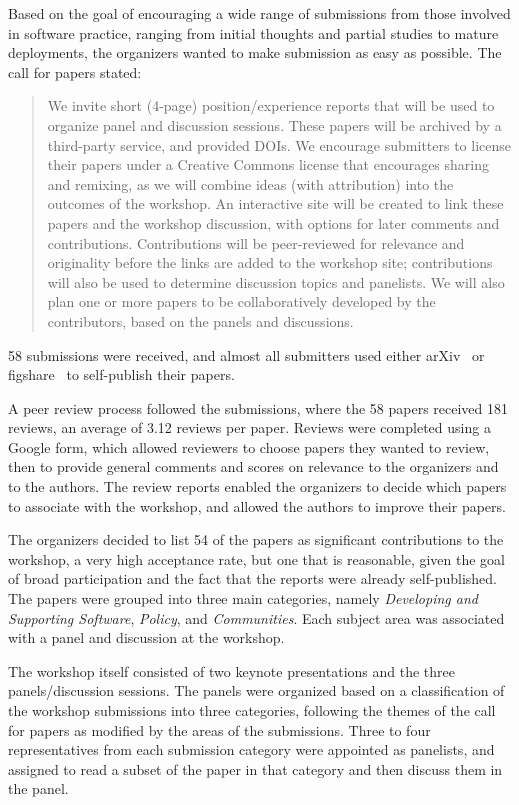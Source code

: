 \documentclass[11pt, oneside]{amsart}
\begin{document}
Based on the goal of encouraging a wide range of submissions from
those involved in software practice, ranging from initial thoughts and
partial studies to mature deployments, the organizers wanted to make
submission as easy as possible. The call for papers stated:

\begin{quote}
We invite short (4-page) position/experience reports that will be used
to organize panel and discussion sessions. These papers will be
archived by a third-party service, and provided DOIs. We encourage
submitters to license their papers under a Creative Commons license
that encourages sharing and remixing, as we will combine ideas (with
attribution) into the outcomes of the workshop.  An interactive site
will be created to link these papers and the workshop discussion, with
options for later comments and contributions. Contributions will be
peer-reviewed for relevance and originality before the links are added
to the workshop site; contributions will also be used to determine
discussion topics and panelists. We will also plan one or more papers
to be collaboratively developed by the contributors, based on the
panels and discussions.
\end{quote}

58 submissions were received, and almost all submitters used either
arXiv~\cite{arXiv-web} or figshare~\cite{figshare-web} to self-publish
their papers.

A peer review process followed the submissions, where
the 58 papers received 181 reviews, an average of 3.12 reviews per
paper. Reviews were completed using a Google form, which allowed
reviewers to choose papers they wanted to review, then to provide
general comments and scores on relevance to the organizers and
to the authors. The review reports enabled the organizers to decide
which papers to associate with the workshop, and allowed the authors
to improve their papers.

The organizers decided to list 54 of the papers as significant
contributions to the workshop, a very high acceptance rate, but one
that is reasonable, given the goal of broad participation and the fact
that the reports were already self-published. The papers were
grouped into three main categories, namely \emph{Developing and
Supporting Software}, \emph{Policy}, and \emph{Communities}. Each
subject area was associated with a panel and discussion at the
workshop.

The workshop itself consisted of two keynote presentations and the
three panels/discussion sessions. The panels were organized based on a
classification of the workshop submissions into three categories,
following the themes of the call for papers as modified by the areas
of the submissions. Three to four representatives from each submission
category were appointed as panelists, and assigned to read a subset of
the paper in that category and then discuss them in the panel.
\end{document}
